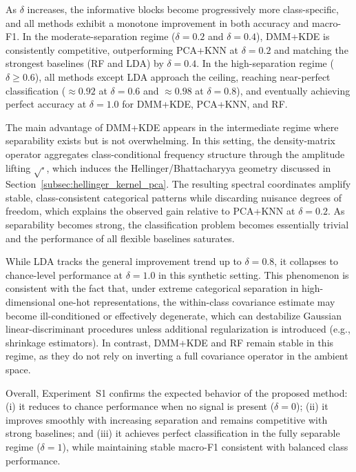 \documentclass[preprint,11pt]{elsarticle}
\begin{document}
As $\delta$ increases, the informative blocks become progressively more class-specific, and all methods exhibit a monotone improvement
in both accuracy and macro-F1. In the moderate-separation regime ($\delta=0.2$ and $\delta=0.4$), DMM+KDE is consistently competitive,
outperforming PCA+KNN at $\delta=0.2$ and matching the strongest baselines (RF and LDA) by $\delta=0.4$.
In the high-separation regime ($\delta\ge 0.6$), all methods except LDA approach the ceiling, reaching near-perfect classification
($\approx 0.92$ at $\delta=0.6$ and $\approx 0.98$ at $\delta=0.8$), and eventually achieving perfect accuracy at $\delta=1.0$
for DMM+KDE, PCA+KNN, and RF.

The main advantage of DMM+KDE appears in the intermediate regime where separability exists but is not overwhelming.
In this setting, the density-matrix operator aggregates class-conditional frequency structure through the amplitude lifting $\sqrt{\cdot}$,
which induces the Hellinger/Bhattacharyya geometry discussed in Section~\ref{subsec:hellinger_kernel_pca}.
The resulting spectral coordinates amplify stable, class-consistent categorical patterns while discarding nuisance degrees of freedom,
which explains the observed gain relative to PCA+KNN at $\delta=0.2$.
As separability becomes strong, the classification problem becomes essentially trivial and the performance of all flexible baselines saturates.

While LDA tracks the general improvement trend up to $\delta=0.8$, it collapses to chance-level performance at $\delta=1.0$ in this synthetic
setting. This phenomenon is consistent with the fact that, under extreme categorical separation in high-dimensional one-hot representations,
the within-class covariance estimate may become ill-conditioned or effectively degenerate, which can destabilize Gaussian linear-discriminant
procedures unless additional regularization is introduced (e.g., shrinkage estimators).
In contrast, DMM+KDE and RF remain stable in this regime, as they do not rely on inverting a full covariance operator in the ambient space.

Overall, Experiment~S1 confirms the expected behavior of the proposed method:
(i) it reduces to chance performance when no signal is present ($\delta=0$);
(ii) it improves smoothly with increasing separation and remains competitive with strong baselines;
and (iii) it achieves perfect classification in the fully separable regime ($\delta=1$), while maintaining stable macro-F1 consistent with
balanced class performance.
\end{document}
